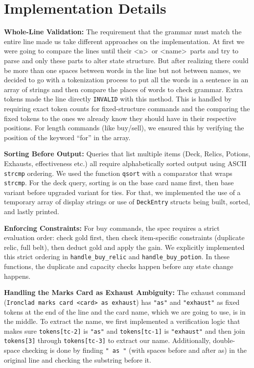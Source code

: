 \documentclass[12pt,a4paper]{article}
\begin{document}
\section{Implementation Details}

\textbf{Whole-Line Validation:} The requirement that the grammar must match the entire line made us take different approaches on the implementation. At first we were going to compare the lines until their \textless n\textgreater\ or \textless name\textgreater\ parts and try to parse and only these parts to alter state structure. But after realizing there could be more than one spaces between words in the line but not between names, we decided to go with a tokenization process to put all the words in a sentence in an array of strings and then compare the places of words to check grammar. Extra tokens made the line directly \texttt{INVALID} with this method. This is handled by requiring exact token counts for fixed-structure commands and the comparing the fixed tokens to the ones we already know they should have in their respective positions. For length commands (like buy/sell), we ensured this by verifying the position of the keyword ``for'' in the array.

\textbf{Sorting Before Output:} Queries that list multiple items (Deck, Relics, Potions, Exhausts, effectiveness etc.) all require alphabetically sorted output using ASCII \texttt{strcmp} ordering. We used the function \texttt{qsort} with a comparator that wraps \texttt{strcmp}. For the deck query, sorting is on the base card name first, then base variant before upgraded variant for ties. For that, we implemented the use of a temporary array of display strings or use of \texttt{DeckEntry} structs being built, sorted, and lastly printed.

\textbf{Enforcing Constraints:} For buy commands, the spec requires a strict evaluation order: check gold first, then check item-specific constraints (duplicate relic, full belt), then deduct gold and apply the gain. We explicitly implemented this strict ordering in \texttt{handle\_buy\_relic} and \texttt{handle\_buy\_potion}. In these functions, the duplicate and capacity checks happen before any state change happens.

\textbf{Handling the Marks Card as Exhaust Ambiguity:} The exhaust command (\texttt{Ironclad marks card <card> as exhaust}) has \texttt{"as"} and \texttt{"exhaust"} as fixed tokens at the end of the line and the card name, which we are going to use, is in the middle. To extract the name, we first implemented a verification logic that makes sure \texttt{tokens[tc-2]} is \texttt{"as"} and \texttt{tokens[tc-1]} is \texttt{"exhaust"} and then join \texttt{tokens[3]} through \texttt{tokens[tc-3]} to extract our name. Additionally, double-space checking is done by finding \texttt{" as "} (with spaces before and after as) in the original line and checking the substring before it.
\end{document}
